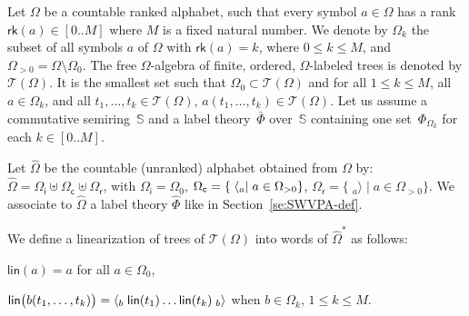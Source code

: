 \documentclass[runningheads]{llncs}
\newcommand{\T}{\mathcal{T}}
\newcommand{\Semiring}{\mathbb{S}}
\newcommand{\call}[1]{\ensuremath #1} %
\newcommand{\return}[1]{\ensuremath #1} %
\def\Omegai{{\Omega_\mathsf{i}}}
\def\Omegac{{\Omega_\mathsf{c}}}
\def\Omegar{{\Omega_\mathsf{r}}}
\newcommand{\rank}{\mathsf{rk}}
\newcommand{\lin}{\mathsf{lin}}
\begin{document}
Let $\Omega$ be a countable ranked alphabet, such that 
every symbol $a \in \Omega$ has a rank 
$\rank(a) \in [0..M]$ where $M$ is a fixed natural number.
We denote by $\Omega_k$ the subset of all symbols $a$ of $\Omega$
with $\rank(a) = k$, where $0 \leq k \leq M$, 
and $\Omega_{>0} = \Omega \setminus \Omega_0$.
%
\noindent 
The free $\Omega$-algebra of finite, ordered, 
$\Omega$-labeled trees is denoted by $\T(\Omega)$.
It is the smallest set such that  $\Omega_0 \subset \T(\Omega)$
and for all $1 \leq k \leq M$, all $a \in \Omega_k$, 
and all $t_1, \ldots, t_k \in \T(\Omega)$, $a(t_1, \ldots, t_k) \in \T(\Omega)$.
%
%
Let us assume a commutative semiring~$\Semiring$ 
and a label theory~$\bar{\Phi}$ over~$\Semiring$ 
containing one set~$\Phi_{\Omega_k}$ for each $k \in [0..M]$.

\renewcommand{\call}[1]{\ensuremath \langle_{#1}}
\renewcommand{\return}[1]{\ensuremath {}_{#1}{\rangle}} %

Let $\hat\Omega$ be the countable (unranked) alphabet obtained
from $\Omega$ by: 
$\hat\Omega = \Omegai \uplus \Omegac \uplus \Omegar$, with
$\Omegai = \Omega_0$, 
$\Omegac = \{ \; \call{a} \mid a \in \Omega_{>0} \}$,
$\Omegar = \{ \; \return{a} \mid a \in \Omega_{>0} \}$.
We associate to $\hat\Omega$
a label theory $\hat{\Phi}$ 
like in Section~\ref{se:SWVPA-def}.

\noindent
We define a linearization of trees of $\T(\Omega)$ into 
words of $\hat{\Omega}^*$ as follows:
\begin{description}
\item $\lin(a) = a$ for all $a \in \Omega_0$, 
\item $\lin\bigl( b(t_1, \ldots, t_k)\bigr) = 
       \call{b} \; \lin(t_1) \ldots \lin(t_k) \; \return{b}$ 
       when $b \in \Omega_k$, $1 \leq k \leq M$.
\end{description}
\end{document}

